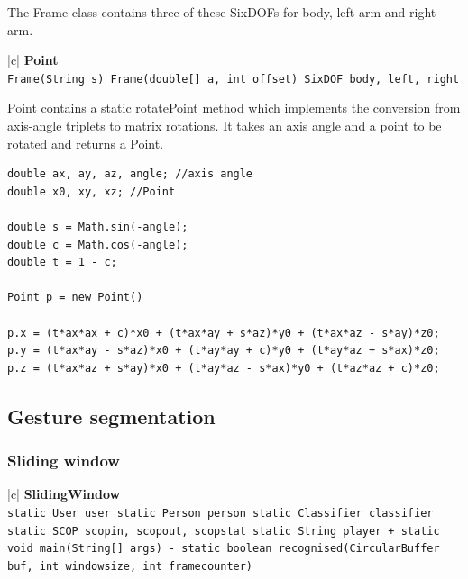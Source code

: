 \documentclass[12pt,a4,notitlepage]{report}
\renewcommand{\_}{\texttt{\symbol{95}}}
\newcommand{\<}{\texttt{\symbol{60}}}
\renewcommand{\>}{\texttt{\symbol{62}}}
\newcommand{\class}[1]{\textbf{#1}}
\newcommand{\variable}[1]{\texttt{#1}}
\begin{document}
{The Frame class contains three of these SixDOFs for body, left arm and right arm.

\begin{tabular}{|c|} \hline 
\class{Point} \\ \hline
{}
{\variable{Frame(String s) \newline
  Frame(double[] a, int offset)\newline
  SixDOF body, left, right 
} } \\ \hline
\end{tabular}

Point contains a static rotatePoint method which implements the conversion from axis-angle triplets to matrix rotations. It takes an axis angle and a point to be rotated and returns a Point.

\begin{verbatim}
double ax, ay, az, angle; //axis angle
double x0, xy, xz; //Point

double s = Math.sin(-angle);
double c = Math.cos(-angle);
double t = 1 - c;

Point p = new Point()

p.x = (t*ax*ax + c)*x0 + (t*ax*ay + s*az)*y0 + (t*ax*az - s*ay)*z0;
p.y = (t*ax*ay - s*az)*x0 + (t*ay*ay + c)*y0 + (t*ay*az + s*ax)*z0;
p.z = (t*ax*az + s*ay)*x0 + (t*ay*az - s*ax)*y0 + (t*az*az + c)*z0;
\end{verbatim}

\subsection{Gesture segmentation}

\subsubsection{Sliding window}

\begin{tabular}{|c|} \hline 
\class{SlidingWindow} \\ \hline
{}
{ \variable{static User user \newline
static Person person \newline
static Classifier classifier \newline
static SCOP scopin, scopout, scopstat \newline
static String player \newline
+ static void main(String[] args) \newline
- static boolean recognised(CircularBuffer buf, int windowsize,	int framecounter)
} } \\ \hline
\end{tabular}

}
\end{document}
